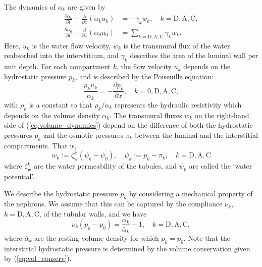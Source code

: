 \documentclass{article}
\begin{document}
The dynamics of $\alpha_k$ are given by
\begin{align}\label{eq:volume_dynamics}
    \frac{\partial \alpha_k}{\partial t} + \frac{\partial}{\partial x}\left( \alpha_k u_k \right) &= -\gamma_kw_k,\quad k=\mathrm{D},\mathrm{A},\mathrm{C},\\
    \frac{\partial \alpha_0}{\partial t} + \frac{\partial }{\partial x}\left( \alpha_0 u_0 \right) &= \sum_{k=\mathrm{D},\mathrm{A},\mathrm{C}} \gamma_kw_k.
\end{align}
Here, $u_k$ is the water flow velocity, $w_k$ is the transmural flux of the water reabsorbed into the interstitium, and $\gamma_k$ describes the area of the luminal wall per unit depth.
For each compartment $k$, the flow velocity $u_k$ depends on the hydrostatic pressure $p_k$, and is described by the Poiseuille equation:
\begin{equation}
    \frac{\rho_k u_k}{\alpha_k} = -\frac{\partial p_k}{\partial x},\quad k=0,\mathrm{D},\mathrm{A},\mathrm{C},
\end{equation}
    with $\rho_k$ is a constant so that $\rho_k/\alpha_k$ represents the hydraulic resistivity which depends on the volume density $\alpha_k$.
The transmural fluxes $w_k$ on the right-hand side of (\ref{eq:volume_dynamics}) depend on the difference of both the hydrostatic pressures $p_k$ and the osmotic pressures $\pi_k$ between the luminal and the interstitial compartments.
That is,
\begin{equation}
    w_k := \zeta_\mathrm{w}^k\left( \psi_k - \psi_0 \right),\quad \psi_k:=p_k - \pi_k,\quad k=\mathrm{D},\mathrm{A},\mathrm{C}
\end{equation}
    where $\zeta_\mathrm{w}^k$ are the water permeability of the tubules, and $\psi_k$ are called the `water potential'.

We describe the hydrostatic pressure $p_k$ by considering a mechanical property of the nephrons.
We assume that this can be captured by the compliance $\nu_k$, $k=\mathrm{D},\mathrm{A},\mathrm{C}$, of the tubular walls, and we have
\begin{equation}
    \nu_k(p_k - p_0) = \frac{\alpha_k}{\bar{\alpha}_k} - 1,\quad k=\mathrm{D},\mathrm{A},\mathrm{C},
\end{equation}
where $\bar{\alpha}_k$ are the resting volume density for which $p_k = p_0$.
Note that the interstitial hydrostatic pressure is determined by the volume conservation given by (\ref{eq:vol_conserv}).
\end{document}
